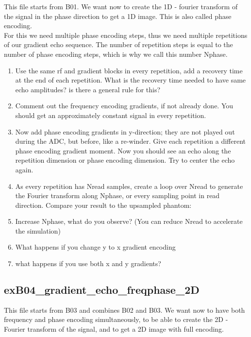 \documentclass[a4paper,12pt]{extarticle}
\begin{document}
This file starts from B01. We want now to create the 1D - fourier transform of the signal in the phase direction to get a 1D image.
This is also called phase encoding. \\
For this we need multiple phase encoding steps, thus we need multiple repetitions of our gradient echo sequence. The number of repetition steps is equal to the number of phase encoding steps, which is why we call this number Nphase.
\begin{enumerate}
\item  Use the same rf and gradient blocks in every repetition, add a recovery time at the end of each repetition. What is the recovery time needed to have same echo amplitudes? is there a general rule for this? 
\item  Comment out the frequency encoding gradients, if not already done. You should get an approximately constant signal in every repetition.
\item Now add phase encoding gradients in y-direction; they are not played out during the ADC, but before, like a re-winder. Give each repetition a different phase encoding gradient moment. Now you should see an echo along the repetition dimension or phase encoding dimension. Try to center the echo again.

\item As every repetition has Nread samples, create a loop over Nread to generate the Fourier transform along Nphase, or every sampling point in read direction. Compare your result to the upsampled phantom:
    
\item Increase Nphase, what do you observe?  (You can reduce Nread to accelerate the simulation)

\item What happens if you change y to x gradient encoding
\item what happens if you use both x and y gradients?
\end{enumerate}

\subsection{exB04\_gradient\_echo\_freqphase\_2D}
This file starts from B03 and combines B02 and B03.
We want now to have both frequency and phase encoding simultaneously,
to be able to create the 2D - Fourier transform of the signal,
and to get a 2D image with full encoding.
\end{document}
